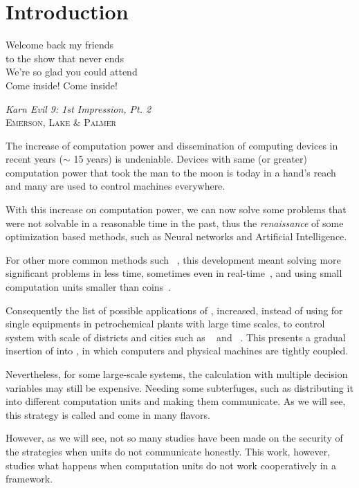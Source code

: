 \documentclass[../main.tex]{subfiles}
\begin{document}
\chapter{Introduction}\label{sec:introduction}
\epigraph{\centering Welcome back my friends\\ to the show that never ends\\
We’re so glad you could attend\\ Come inside! Come inside!}
{\textit{Karn Evil 9: 1st Impression, Pt. 2}\\\textsc{Emerson, Lake \& Palmer}}

The increase of computation power and dissemination of computing devices in recent years ($\sim$ 15 years) is undeniable.
Devices with same (or greater) computation power that took the man to the moon is today in a hand's reach and many are used to control machines everywhere.

With this increase on computation power, we can now solve some problems that were not solvable in a reasonable time in the past, thus the \emph{renaissance} of some optimization based methods, such as Neural networks and Artificial Intelligence.

For other more common methods such \mpc~\cite{GarciaEtAl1989}, this development meant solving more significant problems in less time, sometimes even in real-time~\cite{BesselmannEtAl2008}, and using small computation units smaller than coins~\cite{BanguraMahony2014}.

Consequently the list of possible applications of \mpc{}, increased, instead of using for single equipments in petrochemical plants with large time scales, to control system with scale of districts and cities such as \wdns~\cite{ZhangEtAl2021} and \dhns~\cite{TaylorEtAl2021}.
This presents a gradual insertion of \mpc{} into \cps{}, in which computers and physical machines are tightly coupled.

Nevertheless, for some large-scale systems, the calculation with multiple decision variables may still be expensive.
Needing some subterfuges, such as distributing it into different computation units and making them communicate.
As we will see, this strategy is called \dmpc and come in many flavors.

However, as we will see, not so many studies have been made on the security of the \dmpc{} strategies when units do not communicate honestly.
This work, however, studies what happens when computation units do not work cooperatively in a \dmpc{} framework.
\end{document}

